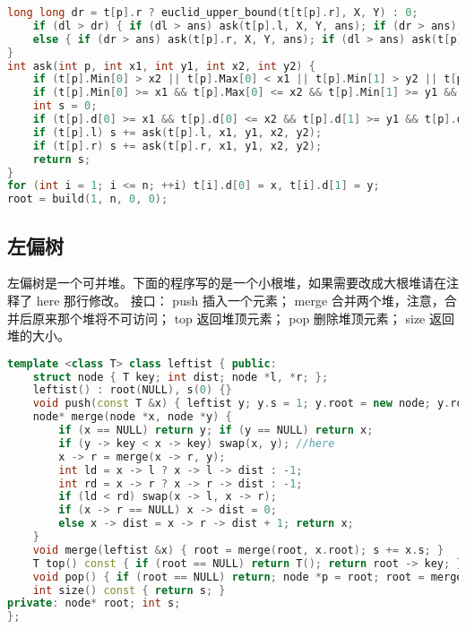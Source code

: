 \documentclass{article}
\begin{document}
\begin{lstlisting}[language=C++]
	long long dr = t[p].r ? euclid_upper_bound(t[t[p].r], X, Y) : 0;
	if (dl > dr) { if (dl > ans) ask(t[p].l, X, Y, ans); if (dr > ans) ask(t[p].r, X, Y, ans); }
	else { if (dr > ans) ask(t[p].r, X, Y, ans); if (dl > ans) ask(t[p].l, X, Y, ans); }
}
int ask(int p, int x1, int y1, int x2, int y2) {
	if (t[p].Min[0] > x2 || t[p].Max[0] < x1 || t[p].Min[1] > y2 || t[p].Max[1] < y1) return 0;
	if (t[p].Min[0] >= x1 && t[p].Max[0] <= x2 && t[p].Min[1] >= y1 && t[p].Max[1] <= y2) return t[p].sum;
	int s = 0;
	if (t[p].d[0] >= x1 && t[p].d[0] <= x2 && t[p].d[1] >= y1 && t[p].d[1] <= y2) s += t[p].val;
	if (t[p].l) s += ask(t[p].l, x1, y1, x2, y2);
	if (t[p].r) s += ask(t[p].r, x1, y1, x2, y2);
	return s;
}
for (int i = 1; i <= n; ++i) t[i].d[0] = x, t[i].d[1] = y;
root = build(1, n, 0, 0);
\end{lstlisting}

\subsection{左偏树}

左偏树是一个可并堆。下面的程序写的是一个小根堆，如果需要改成大根堆请在注释了 here 那行修改。
接口：
 push 插入一个元素；
 merge 合并两个堆，注意，合并后原来那个堆将不可访问；
 top 返回堆顶元素；
 pop 删除堆顶元素；
 size 返回堆的大小。

\begin{lstlisting}[language=C++]
template <class T> class leftist { public:
	struct node { T key; int dist; node *l, *r; };
	leftist() : root(NULL), s(0) {}
	void push(const T &x) { leftist y; y.s = 1; y.root = new node; y.root -> key = x; y.root -> dist = 0; y.root -> l = y.root -> r = NULL; merge(y); }
	node* merge(node *x, node *y) {
		if (x == NULL) return y; if (y == NULL) return x;
		if (y -> key < x -> key) swap(x, y); //here
		x -> r = merge(x -> r, y);
		int ld = x -> l ? x -> l -> dist : -1;
		int rd = x -> r ? x -> r -> dist : -1;
		if (ld < rd) swap(x -> l, x -> r);
		if (x -> r == NULL) x -> dist = 0;
		else x -> dist = x -> r -> dist + 1; return x;
	}
	void merge(leftist &x) { root = merge(root, x.root); s += x.s; }
	T top() const { if (root == NULL) return T(); return root -> key; }
	void pop() { if (root == NULL) return; node *p = root; root = merge(root -> l, root -> r); --s; delete p; }
	int size() const { return s; }
private: node* root; int s;
};
\end{lstlisting}
\end{document}
